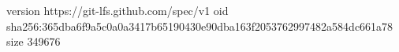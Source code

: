 version https://git-lfs.github.com/spec/v1
oid sha256:365dba6f9a5c0a0a3417b65190430e90dba163f2053762997482a584dc661a78
size 349676
